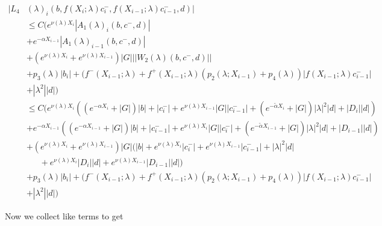 \documentclass[12pt]{article}
\begin{document}
\begin{enumerate}
\begin{align*}
|L_4&(\lambda)_i(b, f(X_i; \lambda) c_i^-, f(X_{i-1}; \lambda) c_{i-1}^-, d)|\\ 
&\leq C\Big( e^{\nu(\lambda)X_{i}} |A_1(\lambda)_i(b, c^-, d)| \\
&+  e^{-\alpha X_{i-1}} |A_1(\lambda)_{i-1}(b, c^-, d)| \\
&+ (e^{\nu(\lambda)X_i} + e^{\nu(\lambda)X_{i-1}}) |G| ||W_2(\lambda)(b,c^-,d)|| \\
&+ p_3(\lambda) |b_i| + (f^-(X_{i-1}; \lambda) + f^+(X_{i-1}; \lambda) (p_2(\lambda; X_{i-1}) + p_4(\lambda)) | f(X_{i-1}; \lambda) c_{i-1}^-| \\
&+|\lambda^2| |d|) \\
&\leq C\Big( e^{\nu(\lambda)X_{i}} ((e^{-\alpha X_i} + |G|) |b| 
+ |c_i^-| + e^{\nu(\lambda)X_{i-1}} |G||c_{i-1}^-| + (e^{-\tilde{\alpha} X_i} + |G|) |\lambda|^2 |d| + |D_i||d|)\\
&+  e^{-\alpha X_{i-1}} ((e^{-\alpha X_{i-1}} + |G|) |b| 
+ |c_{i-1}^-| + e^{\nu(\lambda)X_i} |G||c_i^-| + (e^{-\tilde{\alpha} X_{i-1}} + |G|) |\lambda|^2 |d| + |D_{i-1}||d|) \\
&+ (e^{\nu(\lambda)X_i} + e^{\nu(\lambda)X_{i-1}}) |G| ( |b| + e^{\nu(\lambda) X_i} |c_i^-| +  e^{\nu(\lambda) X_{i-1}} |c_{i-1}^-| + |\lambda|^2 |d| \\
&\:\:\:\:\:\:\:+ e^{\nu(\lambda) X_i} |D_i| |d| + e^{\nu(\lambda) X_{i-1}} |D_{i-1}| |d| ) \\
&+ p_3(\lambda) |b_i| + (f^-(X_{i-1}; \lambda) + f^+(X_{i-1}; \lambda) (p_2(\lambda; X_{i-1}) + p_4(\lambda)) | f(X_{i-1}; \lambda) c_{i-1}^-| \\
&+|\lambda^2| |d|)
\end{align*}

Now we collect like terms to get


\end{enumerate}
\end{document}
